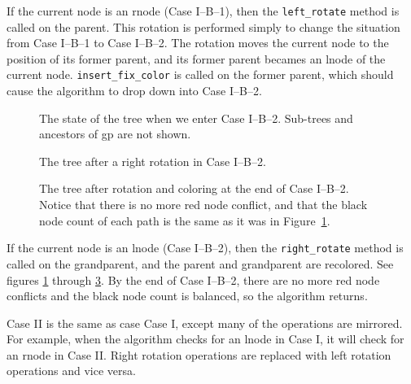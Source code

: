 \documentclass[12pt, letterpaper]{article}
\begin{document}
If the current node is an rnode (Case I--B--1), then the \texttt{left\_rotate} method is called on the parent. This rotation is performed simply to change the situation from Case I--B--1 to Case I--B--2. The rotation moves the current node to the position of its former parent, and its former parent becames an lnode of the current node. \texttt{insert\_fix\_color} is called on the former parent, which should cause the algorithm to drop down into Case I--B--2.
\begin{figure}
\centering
{}
\caption{The state of the tree when we enter Case I--B--2. Sub-trees and ancestors of gp are not shown.}
\label{Case1b2Before}
\end{figure}
\begin{figure}
\centering
{}
\caption{The tree after a right rotation in Case I--B--2.}
\label{Case1b2Rotated}
\end{figure}
\begin{figure}
\centering
{}
\caption{The tree after rotation and coloring at the end of Case I--B--2. Notice that there is no more red node conflict, and that the black node count of each path is the same as it was in Figure~\ref{Case1b2Before}.}
\label{Case1b2Colored}
\end{figure}

If the current node is an lnode (Case I--B--2), then the \texttt{right\_rotate} method is called on the grandparent, and the parent and grandparent are recolored. See figures \ref{Case1b2Before} through \ref{Case1b2Colored}. By the end of Case I--B--2, there are no more red node conflicts and the black node count is balanced, so the algorithm returns.

Case II is the same as case Case I, except many of the operations are mirrored. For example, when the algorithm checks for an lnode in Case I, it will check for an rnode in Case II. Right rotation operations are replaced with left rotation operations and vice versa.
\end{document}
